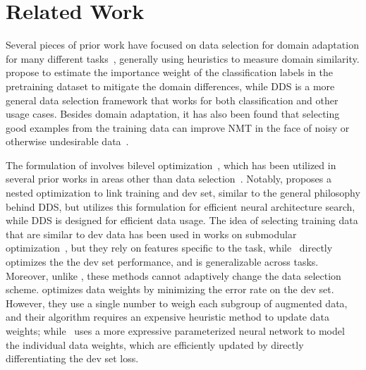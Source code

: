 \section{\label{sec:related_work}Related Work}

Several pieces of prior work have focused on data selection for domain adaptation for many different tasks~\citep{moore2010intelligent,axelrod2011domain,domain_adapt_transfer,jiang-zhai-2007-instance,foster-etal-2010-discriminative,wang-etal-2017-instance}, generally using heuristics to measure domain similarity.
\cite{domain_adapt_transfer} propose to estimate the importance weight of the classification labels in the pretraining dataset to mitigate the domain differences, while DDS is a more general data selection framework that works for both classification and other usage cases.
Besides domain adaptation, it has also been found that selecting good examples from the training data can improve NMT in the face of noisy or otherwise undesirable data~\citep{vyas-etal-2018-identifying,pham-etal-2018-fixing}.  

The formulation of \dds involves bilevel optimization~\citep{bilevel_optim,hier_optim}, which has been utilized in several prior works in areas other than data selection~\citep{darts,hyper_grad,finn2017model}.
Notably, \cite{darts} proposes a nested optimization to link training and dev set, similar to the general philosophy behind DDS, but utilizes this formulation for efficient neural architecture search, while DDS is designed for efficient data usage. The idea of selecting training data that are similar to dev data has been used in works on submodular optimization~\citep{submodular_mt,learn_mix_submodular}, but they rely on features specific to the task, while \dds~directly optimizes the the dev set performance, and is generalizable across tasks. Moreover, unlike \dds, these methods cannot adaptively change the data selection scheme. \cite{importance_weight} optimizes data weights by minimizing the error rate on the dev set. However, they use a single number to weigh each subgroup of augmented data, and their algorithm requires an expensive heuristic method to update data weights; while \dds~uses a more expressive parameterized neural network to model the individual data weights, which are efficiently updated by directly differentiating the dev set loss.


